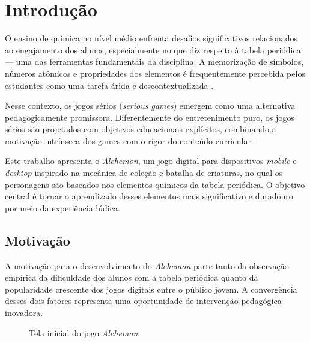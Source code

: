 
\section{Introdução}

O ensino de química no nível médio enfrenta desafios significativos relacionados
ao engajamento dos alunos, especialmente no que diz respeito à tabela periódica —
uma das ferramentas fundamentais da disciplina. A memorização de símbolos, números
atômicos e propriedades dos elementos é frequentemente percebida pelos estudantes
como uma tarefa árida e descontextualizada \cite{prensky2001digital}.

Nesse contexto, os jogos sérios (\textit{serious games}) emergem como uma alternativa
pedagogicamente promissora. Diferentemente do entretenimento puro, os jogos sérios
são projetados com objetivos educacionais explícitos, combinando a motivação intrínseca
dos games com o rigor do conteúdo curricular \cite{gee2003videogames}.

Este trabalho apresenta o \textit{Alchemon}, um jogo digital para dispositivos
\textit{mobile} e \textit{desktop} inspirado na mecânica de coleção e batalha de
criaturas, no qual os personagens são baseados nos elementos químicos da tabela
periódica. O objetivo central é tornar o aprendizado desses elementos mais
significativo e duradouro por meio da experiência lúdica.


\subsection{Motivação}

A motivação para o desenvolvimento do \textit{Alchemon} parte tanto da observação
empírica da dificuldade dos alunos com a tabela periódica quanto da popularidade
crescente dos jogos digitais entre o público jovem. A convergência desses dois
fatores representa uma oportunidade de intervenção pedagógica inovadora.

\begin{figure}[htbp]
    \centering
    \caption{Tela inicial do jogo \textit{Alchemon}.}
    \label{fig:tela_inicial}
\end{figure}


